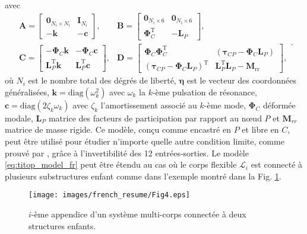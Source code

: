 avec
\begin{equation}
	\begin{array}{ll}
		\mathbf{A} = \left[\begin{array}{cc}
\mathbf{0}_{N_i\times N_i} & \mathbf{I}_{N_i} \\
-\mathbf{k} & -\mathbf{c}
\end{array}\right], & \mathbf{B} = \left[\begin{array}{cc}
\mathbf{0}_{N_i\times 6} & \mathbf{0}_{N_i\times 6} \\
\mathbf{\Phi}_{C}^{\mathrm{T}} & -\mathbf{L}_{P}
\end{array}\right], \\
\mathbf{C}= \left[\begin{array}{cc}
	-\mathbf{\Phi}_{C}\mathbf{k} & -\mathbf{\Phi}_{C}\mathbf{c} \\
	\mathbf{L}_{P}^{\mathrm{T}}\mathbf{k} & \mathbf{L}_{P}^{\mathrm{T}}\mathbf{c}
\end{array}\right],  & \mathbf{D} = \left[\begin{array}{cc}
	\mathbf{\Phi}_{C}\mathbf{\Phi}_{C}^{\mathrm{T}} & (\bm{\tau}_{CP}-\mathbf{\Phi}_{C}\mathbf{L}_{P}) \\
	(\bm{\tau}_{CP}-\mathbf{\Phi}_{C}\mathbf{L}_{P})^{\mathrm{T}} & \mathbf{L}_{P}^{\mathrm{T}}\mathbf{L}_{P} - \mathbf{M}_{\mathrm{rr}}
\end{array}\right],
\end{array}.
\end{equation}
où $N_i$ est le nombre total des d\'egr\'es de libert\'e, $\bm{\eta}$ est le vecteur des coordonn\'ees g\'en\'eralis\'ees, $\mathbf{k}=\mathrm{diag}(\omega_k^2)$ avec $\omega_k $ la $k$-\`eme pulsation de résonance, $\mathbf{c}=\mathrm{diag}(2\zeta_k\omega_k)$ avec $\zeta_k $ l'amortissement associ\'e au $k$-\`eme mode, $\bm{\Phi}_{C}$ déformée modale, $\mathbf{L}_{P}$ matrice des facteurs de participation par rapport au nœud $P$ et $\mathbf{M}_{rr}$ matrice de masse rigide.
Ce mod\`ele, conçu comme encastr\'e en $P$ et libre en $C$, peut être utilisé pour \'etudier n'importe quelle autre condition limite, comme prouv\'e par \cite{chebbi2016linear}, gr\^ace \`a l'invertibilit\'e des 12 entr\'ees-sorties.
Le mod\`ele \eqref{eq:titop_model_fr} peut être \'etendu au cas où le corps flexible $\mathcal{L}_i$ est connect\'e \`a plusieurs substructures enfant  comme dans l'exemple montr\'e dans la Fig. \ref{fig:NINOP_fr}. 

\begin{figure}[ht]
\centering
\texttt{[image: images/french\_resume/Fig4.eps]} %
\caption{$i$-\`eme appendice d'un syst\`eme multi-corps connect\'ee \`a deux structures enfants.} 
\label{fig:NINOP_fr}
\end{figure}

